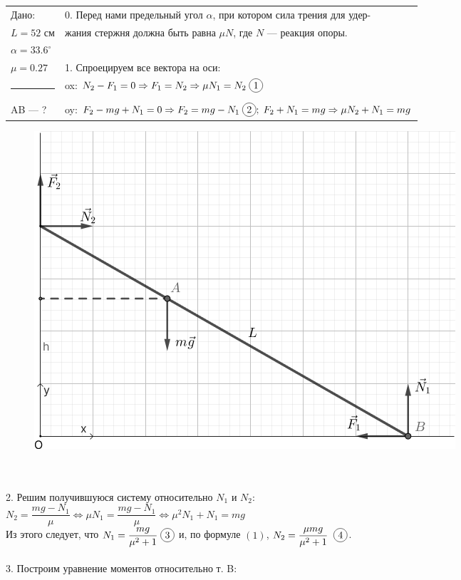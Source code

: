 \documentclass{article}
\newcommand*\circled[1]{\tikz[baseline=(char.base)]{
            \node[shape=circle,draw,inner sep=2pt] (char) {#1};}}
\begin{document}
\noindent \begin{tabular}{l|l}
    Дано: & 0. Перед нами предельный угол $\alpha$, при котором сила трения для удер- \\
    $L = 52$ см & жания стержня должна быть равна $\mu N$, где $N$ --- реакция опоры. \\
    $\alpha = 33.6^{\circ}$ & \\
    $\mu = 0.27$ & 1. Спроецируем все вектора на оси: \\
    \rule{76px}{0.5pt} & ox: $N_2 - F_1 = 0 \Rightarrow F_1 = N_2 \Rightarrow \mu N_1 = N_2\;\circled{1}$\\
    AB --- ? & oy: $F_2 - mg + N_1 = 0 \Rightarrow F_2 = mg - N_1\;\circled{2};\; F_2 + N_1 = mg \Rightarrow \mu N_2 + N_1 = mg$
\end{tabular}\begin{figure}\includegraphics[width=\linewidth]{"1_graphics"}\end{figure} \\ \, \\
2. Решим получившуюся систему относительно $N_1$ и $N_2$: \\
$N_2 = \dfrac{mg - N_1}{\mu} \Leftrightarrow \mu N_1 = \dfrac{mg - N_1}{\mu} \Leftrightarrow \mu^2 N_1 + N_1 = mg$\\
Из этого следует, что $N_1 = \dfrac{mg}{\mu^2+1}\;\circled{3}$ и, по формуле $(1)$, $N_2 = \dfrac{\mu mg}{\mu^2+1}\;\;\circled{4}$.\\ \, \\ 
3. Построим уравнение моментов относительно т. B: \\
\end{document}
